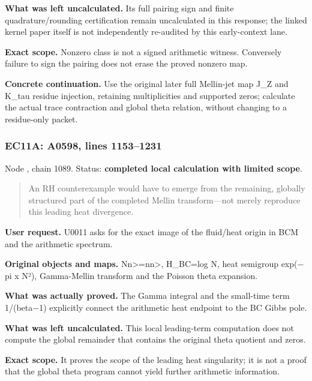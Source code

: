 \documentclass[10pt,a4paper,oneside]{report}
\begin{document}
\textbf{What was left uncalculated.} Its full pairing sign and finite
quadrature/rounding certification remain uncalculated in this response;
the linked kernel paper itself is not independently re-audited by this
early-context lane.

\textbf{Exact scope.} Nonzero class is not a signed arithmetic witness.
Conversely failure to sign the pairing does not erase the proved nonzero
map.

\textbf{Concrete continuation.} Use the original later full Mellin-jet
map J\_Z and K\_tau residue injection, retaining multiplicities and
supported zeros; calculate the actual trace contraction and global theta
relation, without changing to a residue-only packet.

\subsubsection{EC11A: A0598, lines
1153--1231}\label{ec11a-a0598-lines-11531231}

Node \protect{}, chain 1089.
Status: \textbf{completed local calculation with limited scope}.

\begin{quote}
An RH counterexample would have to emerge from the remaining, globally
structured part of the completed Mellin transform---not merely reproduce
this leading heat divergence.
\end{quote}

\textbf{User request.} U0011 asks for the exact image of the fluid/heat
origin in BCM and the arithmetic spectrum.

\textbf{Original objects and maps.}
N\textbar n\textgreater=n\textbar n\textgreater, H\_BC=log N, heat
semigroup exp(\allowbreak{}\ensuremath{−}\allowbreak{}pi x N²),
Gamma-Mellin transform and the Poisson theta expansion.

\textbf{What was actually proved.} The Gamma integral and the small-time
term 1/(beta\allowbreak{}\ensuremath{−}\allowbreak{}1) explicitly
connect the arithmetic heat endpoint to the BC Gibbs pole.

\textbf{What was left uncalculated.} This local leading-term computation
does not compute the global remainder that contains the original theta
quotient and zeros.

\textbf{Exact scope.} It proves the scope of the leading heat
singularity; it is not a proof that the global theta program cannot
yield further arithmetic information.
\end{document}
